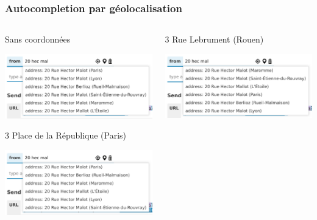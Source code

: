 \documentclass[table]{beamer}
\begin{document}
\begin{frame}
  \frametitle{Autocompletion par géolocalisation}

  \centering
  \begin{columns}
    \begin{column}{.5\linewidth}
      \begin{block}{\strut Sans coordonnées}
        \includegraphics[width=\textwidth]{images/autocomplete-20-hec-mal}
      \end{block}
      \begin{block}{\strut 3 Place de la République (Paris)}
        \includegraphics[width=\textwidth]{images/autocomplete-20-hec-mal-paris}
      \end{block}
    \end{column}
    \begin{column}{.5\linewidth}
      \begin{block}{\strut 3 Rue Lebrument (Rouen)}
        \includegraphics[width=\textwidth]{images/autocomplete-20-hec-mal-rouen}

\end{block}
\end{column}
\end{columns}
\end{frame}
\end{document}
